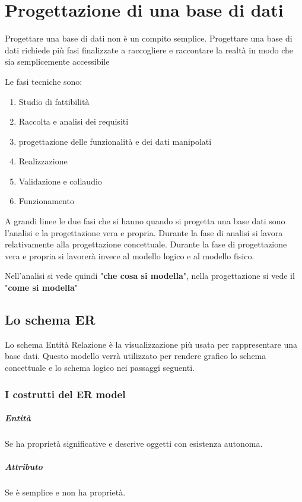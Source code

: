 \chapter{Progettazione di una base di dati}

Progettare una base di dati non è un compito semplice. Progettare una base di dati richiede più fasi finalizzate a raccogliere e raccontare la realtà in modo che sia semplicemente accessibile

Le fasi tecniche sono:
\begin{enumerate}
    \item Studio di fattibilità
    \item Raccolta e analisi dei requisiti
    \item progettazione delle funzionalità e dei dati manipolati
    \item Realizzazione
    \item Validazione e collaudio
    \item Funzionamento
\end{enumerate}

A grandi linee le due fasi che si hanno quando si progetta una base dati sono l'analisi e la progettazione vera e propria. Durante la fase di analisi si lavora relativamente alla progettazione concettuale. Durante la fase di progettazione vera e propria si lavorerà invece al modello logico e al modello fisico.

Nell'analisi si vede quindi "\textbf{che cosa si modella}", nella progettazione si vede il "\textbf{come si modella}"

\section{Lo schema ER}

Lo schema Entità Relazione è la visualizzazione più usata per rappresentare una base dati. Questo modello verrà utilizzato per rendere grafico lo schema concettuale e lo schema logico nei passaggi seguenti.


\subsection{I costrutti del ER model}

\paragraph{Entità} Se ha proprietà significative e descrive oggetti con esistenza autonoma.
\paragraph{Attributo} Se è semplice e non ha proprietà.
